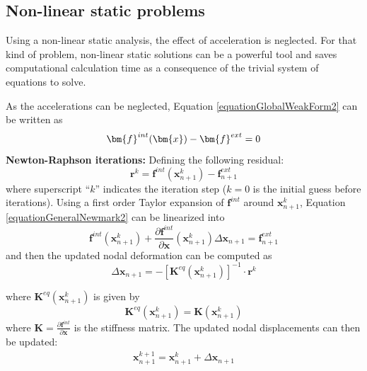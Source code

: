 \documentclass[oneside,11pt,times]{book}
\begin{document}
\subsection[Static problems]{Non-linear static problems}
Using a non-linear static analysis, the effect of acceleration is neglected. For that kind of problem, non-linear static solutions can be a powerful tool and saves computational calculation time as a consequence of the trivial system of equations to solve.

As the accelerations can be neglected, Equation \eqref{equationGlobalWeakForm2} can be written as
\begin{equation}
\centering
\bm{f}^{int}(\bm{x})-\bm{f}^{ext}=0
\label{eq:alpha1}
\end{equation}
\textbf{Newton-Raphson iterations:}
Defining the following residual:
\begin{equation} \label{equationResidualMomentum0}
 \bm{r}^{k} = \bm{f}^{int}(\bm{x}^{k}_{n+1}) - \bm{f}^{ext}_{n+1}
\end{equation}
where superscript ``$k$'' indicates the iteration step ($k = 0$ is the initial guess before iterations). Using a first order Taylor expansion of $\bm{f}^{int}$ around $\bm{x}^{k}_{n+1}$, Equation \eqref{equationGeneralNewmark2} can be linearized into
\begin{equation} \label{equationLinearizedBalanceMomentum0}
 \bm{f}^{int} (\bm{x}^{k}_{n+1}) + \frac{\partial \bm{f}^{int}}{\partial \bm{x}}(\bm{x}^{k}_{n+1})
 \Delta \bm{x}_{n+1} = \bm{f}^{ext}_{n+1}
\end{equation}
and then the updated nodal deformation can be computed as
\begin{equation} \label{equationUpdatedPosition0}
 \Delta \bm{x}_{n+1} = - [\bm{K}^{eq}(\bm{x}^{k}_{n+1})]^{-1} \cdot \bm{r}^{k}
\end{equation}

where $\bm{K}^{eq}(\bm{x}^{k}_{n+1})$ is given by
%
\begin{equation} \label{equationJacobianMatrix0}
 \bm{K}^{eq}(\bm{x}^{k}_{n+1}) = \bm{K} (\bm{x}^{k}_{n+1})
\end{equation}
%
where $\bm{K} = \frac{\partial \bm{f}^{int}}{\partial \bm{x}}$ is the stiffness matrix. The updated nodal displacements can then be updated:
\begin{eqnarray}\label{juli0}
 \bm{x}^{k+1}_{n+1}= \bm{x}^{k}_{n+1}+\Delta \bm{x}_{n+1}
\end{eqnarray}
\end{document}
